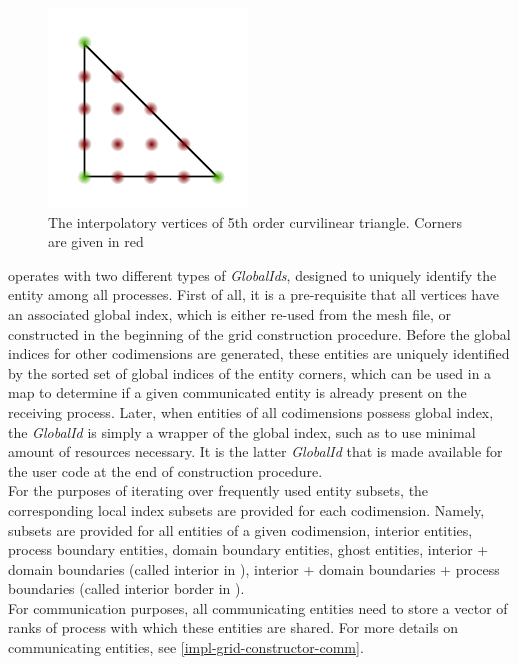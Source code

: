 \begin{figure}
    \centering
	\includegraphics[scale=1.5]{images/vertex-vs-corner}
	\caption{The interpolatory vertices of 5th order curvilinear triangle. Corners are given in red}
	\label{fig:impl:storage:vertexvscorner}
\end{figure}

\noindent
\curvgrid{} operates with two different types of \textit{GlobalIds}, designed to uniquely identify the entity among all processes. First of all, it is a pre-requisite that all vertices have an associated global index, which is either re-used from the mesh file, or constructed in the beginning of the grid construction procedure. Before the global indices for other codimensions are generated, these entities are uniquely identified by the sorted set of global indices of the entity corners, which can be used in a map to determine if a given communicated entity is already present on the receiving process. Later, when entities of all codimensions possess global index, the \textit{GlobalId} is simply a wrapper of the global index, such as to use minimal amount of resources necessary. It is the latter \textit{GlobalId} that is made available for the user code at the end of construction procedure. \\

\noindent
For the purposes of iterating over frequently used entity subsets, the corresponding local index subsets are provided for each codimension. Namely, subsets are provided for all entities of a given codimension, interior entities, process boundary entities, domain boundary entities, ghost entities, interior + domain boundaries (called interior in \dune{}), interior + domain boundaries + process boundaries (called interior border in \dune{}). \\

\noindent
For communication purposes, all communicating entities need to store a vector of ranks of process with which these entities are shared. For more details on communicating entities, see \cref{impl-grid-constructor-comm}.





